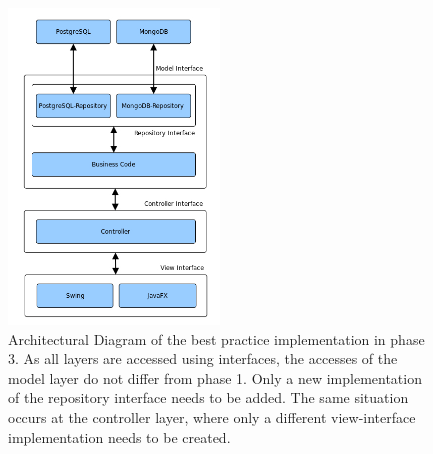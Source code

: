 \begin{figure}[htbp]
		\centering
	\includegraphics[width=0.5\textwidth]{./content/pictures/bpV3.jpg}
	\caption[Architectual Diagram of the best practice implementation in phase 3.]{Architectural Diagram of the best practice implementation in phase 3. As all layers are accessed using interfaces, the accesses of the model layer do not differ from phase 1. Only a new implementation of the repository interface needs to be added. The same situation occurs at the controller layer, where only a different view-interface implementation needs to be created.}
	\label{fig:bpV3}
\end{figure}


